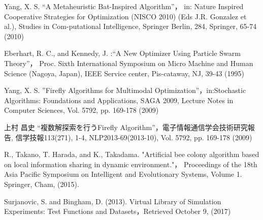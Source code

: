 \documentclass{jarticle}
\begin{document}
\small
\begin{thebibliography}{10}


Yang, X. S. “A Metaheuristic Bat-Inspired Algorithm”， in: Nature Inspired Cooperative Strategies for Optimization (NISCO 2010) (Eds J.R. Gonzalez et al.), Studies in Com-putational Intelligence, Springer Berlin, 284, Springer, 65-74 (2010)

Eberhart, R. C., and Kennedy, J. :“A New Optimizer Using Particle Swarm Theory”，
Proc. Sixth International Symposium on Micro Machine and Human Science (Nagoya, Japan), IEEE Service center, Pis-cataway, NJ, 39-43 (1995)

Yang, X. S. ”Firefly Algorithms for Multimodal Optimization”，in:Stochastic Algorithms: Foundations and Applications, SAGA 2009, Lecture Notes in Computer Sciences, Vol. 5792, pp. 169-178 (2009)

上村 昌史 “複数解探索を行うFirefly Algorithm”，電子情報通信学会技術研究報告, 信学技報113(271), 1-4, NLP2013-69(2013-10), Vol. 5792, pp. 169-178 (2009)

R., Takano, T. Harada, and K., Takadama. "Artificial bee colony algorithm based on local information sharing in dynamic environment."， Proceedings of the 18th Asia Pacific Symposium on Intelligent and Evolutionary Systems, Volume 1. Springer, Cham, (2015).

Surjanovic, S. and Bingham, D. (2013).  Virtual Library of Simulation Experiments: Test Functions and Datasets，Retrieved October 9, (2017)
\end{thebibliography}
\normalsize
\end{document}
